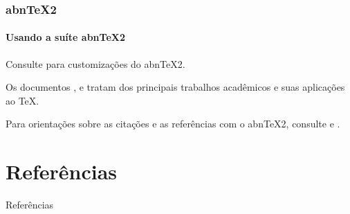\documentclass[aspectratio=169]{beamer}
\begin{document}
\begin{frame}
\frametitle{abnTeX2}
\framesubtitle{Usando a suíte abnTeX2}

Consulte  para customizações do abnTeX2.
\vspace{0.5cm}

Os documentos ,
 e  tratam dos
principais trabalhos acadêmicos e suas aplicações ao TeX.
\vspace{0.5cm}

Para orientações sobre as citações e as referências com o abnTeX2, consulte
 e .
\vspace{0.5cm}

\end{frame}

\section{Referências}


\begin{frame}[allowframebreaks]{Referências}

\end{frame}

\end{document}
